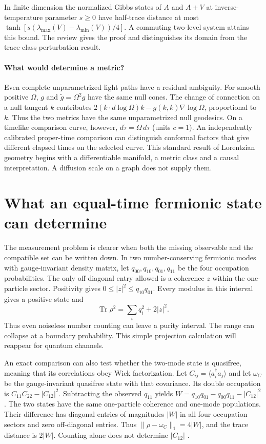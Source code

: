 \documentclass[11pt,letterpaper]{article}
\newcommand{\tr}{\operatorname{Tr}}\newcommand{\TV}{\operatorname{TV}}\newcommand{\E}{\mathbb E}\newcommand{\id}{\mathbb I}\newcommand{\calB}{\mathcal B}\newcommand{\norm}[1]{\left\lVert#1\right\rVert}
\begin{document}
In finite dimension the normalized Gibbs states of $A$ and $A+V$ at inverse-temperature parameter $s\ge0$ have half-trace distance at most $\tanh[s(\lambda_{\max}(V)-\lambda_{\min}(V))/4]$. A commuting two-level system attains this bound. The review gives the proof and distinguishes its domain from the trace-class perturbation result.

\paragraph{What would determine a metric?}
Even complete unparametrized light paths have a residual ambiguity. For smooth positive $\Omega$, $g$ and $\widetilde g=\Omega^2g$ have the same null cones. The change of connection on a null tangent $k$ contributes $2(k\cdot d\log\Omega)k-g(k,k)\nabla\log\Omega$, proportional to $k$. Thus the two metrics have the same unparametrized null geodesics. On a timelike comparison curve, however, $d\widetilde\tau=\Omega\,d\tau$ (units $c=1$). An independently calibrated proper-time comparison can distinguish conformal factors that give different elapsed times on the selected curve. This standard result of Lorentzian geometry \cite{conformal} begins with a differentiable manifold, a metric class and a causal interpretation. A diffusion scale on a graph does not supply them.

\section{What an equal-time fermionic state can determine}\label{sec:ferm}

The measurement problem is clearer when both the missing observable and the compatible set can be written down. In two number-conserving fermionic modes with gauge-invariant density matrix, let $q_{00},q_{10},q_{01},q_{11}$ be the four occupation probabilities. The only off-diagonal entry allowed is a coherence $z$ within the one-particle sector. Positivity gives $0\le |z|^2\le q_{10}q_{01}$. Every modulus in this interval gives a positive state and
\[
 \tr\rho^2=\sum_i q_i^2+2|z|^2 .
\]
Thus even noiseless number counting can leave a purity interval. The range can collapse at a boundary probability. This simple projection calculation will reappear for quantum channels.

An exact comparison can also test whether the two-mode state is quasifree, meaning that its correlations obey Wick factorization. Let $C_{ij}=\langle a_i^\dagger a_j\rangle$ and let $\omega_C$ be the gauge-invariant quasifree state with that covariance. Its double occupation is $C_{11}C_{22}-|C_{12}|^2$. Subtracting the observed $q_{11}$ yields $W=q_{10}q_{01}-q_{00}q_{11}-|C_{12}|^2$. The two states have the same one-particle coherence and one-mode populations. Their difference has diagonal entries of magnitudes $|W|$ in all four occupation sectors and zero off-diagonal entries. Thus $\|\rho-\omega_C\|_1=4|W|$, and the trace distance is $2|W|$. Counting alone does not determine $|C_{12}|$ \cite{twomode}.
 
\end{document}

